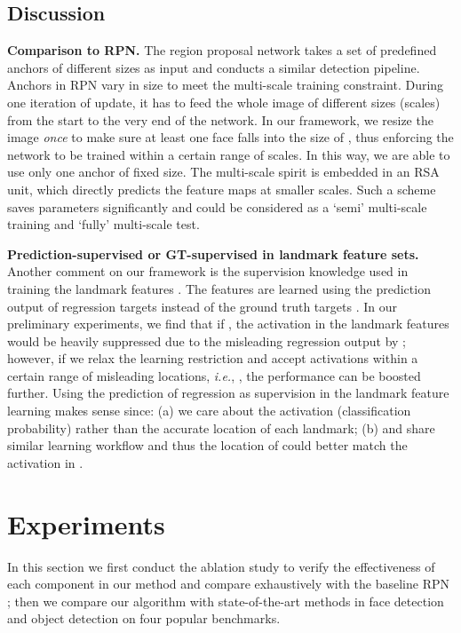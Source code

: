 \documentclass[10pt,twocolumn,letterpaper]{article}
\begin{document}
\subsection{Discussion}\label{sec:discussion}

\textbf{Comparison to RPN.}  The region proposal network \cite{faster_rcnn} takes a set of predefined anchors of different sizes as input and conducts a similar detection pipeline.
Anchors in RPN vary in size to meet the multi-scale training constraint. During one iteration of update, it has to feed the whole image of different sizes (scales) from the start to the very end of the network.
In our framework, we resize the image \textit{once} to make sure at least one face 
falls into the size of , thus enforcing the network to be trained within a certain range of scales. In this way, we are able to use only one anchor of fixed size. The multi-scale spirit is embedded in an RSA unit, which directly predicts the feature maps at smaller scales. Such a scheme saves parameters significantly and could be considered as a `semi' multi-scale training and `fully' multi-scale test. 


\textbf{Prediction-supervised or GT-supervised in landmark feature sets.} 
Another comment on our framework is the supervision knowledge used in training the landmark features . The features are learned using the prediction output of regression targets  instead of the ground truth targets . In our preliminary experiments, we find that if , the activation in the landmark features would be heavily suppressed due to the misleading regression output by ; however, if we relax the  learning restriction and accept activations within a certain range of misleading locations, \textit{i.e.}, , the performance can be boosted further. Using the prediction of regression as supervision in the landmark feature learning makes sense since: (a) we care about the activation (classification probability) rather than the accurate location of each landmark; (b)  and  share similar learning workflow and thus the location of  could better match the activation  in .   

\section{Experiments}

In this section we first conduct the ablation study to verify the effectiveness of each component in our method and compare exhaustively with the baseline RPN \cite{faster_rcnn}; then we compare our algorithm with state-of-the-art methods in face detection and object detection on four popular benchmarks.
\end{document}
